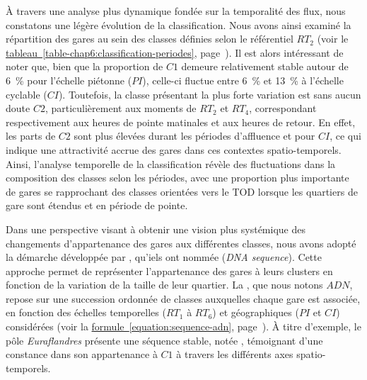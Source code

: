\begin{refsegment}
À travers une analyse plus dynamique fondée sur la temporalité des flux, nous constatons une légère évolution de la classification. Nous avons ainsi examiné la répartition des gares au sein des classes définies selon le référentiel \(RT_{2}\) (voir le \hyperref[table-chap6:classification-periodes]{tableau~\ref{table-chap6:classification-periodes}}, page~\pageref{table-chap6:classification-periodes}). Il est alors intéressant de noter que, bien que la proportion de \(C1\) demeure relativement stable autour de 6~\% pour l’échelle piétonne (\(PI\)), celle-ci fluctue entre 6~\% et 13~\% à l’échelle cyclable (\(CI\)). Toutefois, la classe présentant la plus forte variation est sans aucun doute \(C2\), particulièrement aux moments de \(RT_{2}\) et \(RT_{4}\), correspondant respectivement aux heures de pointe matinales et aux heures de retour. En effet, les parts de \(C2\) sont plus élevées durant les périodes d’affluence et pour \(CI\), ce qui indique une attractivité accrue des gares dans ces contextes spatio-temporels. Ainsi, l’analyse temporelle de la classification révèle des fluctuations dans la composition des classes selon les périodes, avec une proportion plus importante de gares se rapprochant des classes orientées vers le \acrshort{TOD} lorsque les quartiers de gare sont étendus et en période de pointe.%

Dans une perspective visant à obtenir une vision plus systémique des changements d’appartenance des gares aux différentes classes, nous avons adopté la démarche développée par \textcolor{blue}{\textcite[518]{caset_measuring_2018}}, qu’iels ont nommée  (\textsl{DNA sequence}). Cette approche permet de représenter l’appartenance des gares à leurs clusters en fonction de la variation de la taille de leur quartier. La , que nous notons \(ADN\), repose sur une succession ordonnée de classes auxquelles chaque gare est associée, en fonction des échelles temporelles (\(RT_{1}\) à \(RT_{6}\)) et géographiques (\(PI\) et \(CI\)) considérées (voir la \hyperref[equation:sequence-adn]{formule~\ref{equation:sequence-adn}}, page~\pageref{equation:sequence-adn}). À titre d’exemple, le pôle \textsl{Euraflandres} présente une séquence stable, notée , témoignant d'une constance dans son appartenance à \(C1\) à travers les différents axes spatio-temporels.%


\end{refsegment}
